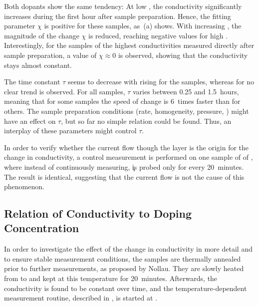 Both dopants show the same tendency: At low \C, the \insitu conductivity significantly increases during the first hour after sample preparation. Hence, the fitting parameter $\chi$ is positive for these samples, as \,(a) shows. With increasing \C, the magnitude of the change $\chi$ is reduced, reaching negative values for high . Interestingly, for the samples of the highest conductivities measured directly after sample preparation, a value of $\chi\approx0$ is observed, showing that the conductivity stays almost constant.

The time constant $\tau$ seems to decrease with rising \C for the \WPd samples, whereas for \CrPd no clear trend is observed. For all samples, $\tau$ varies between 0.25 and 1.5~hours, meaning that for some samples the speed of change is 6~times faster than for others. The sample preparation conditions (rate, homogeneity, pressure, \etc) might have an effect on $\tau$, but so far no simple relation could be found. Thus, an interplay of these parameters might control $\tau$.

In order to verify whether the current flow though the layer is the origin for the change in conductivity, a control measurement is performed on one sample of \C[0.033] of \WPd, %
where instead of continuously measuring, \c is probed only for  every 20~minutes. The result is identical, suggesting that the current flow is not the cause of this phenomenon.

\subsection{Relation of Conductivity to Doping Concentration}%
\label{sec:ResPdCondMR}
In order to investigate the effect of the change in conductivity in more detail and to ensure stable measurement conditions, the samples are thermally annealed prior to further measurements, as proposed by Nollau\etal\cite{Nollau2000}. They are slowly heated from \T[25] to  and kept at this temperature for 20~minutes. Afterwards, the conductivity is found to be constant over time, and the temperature-dependent measurement routine, described in , is started at \T[30].

